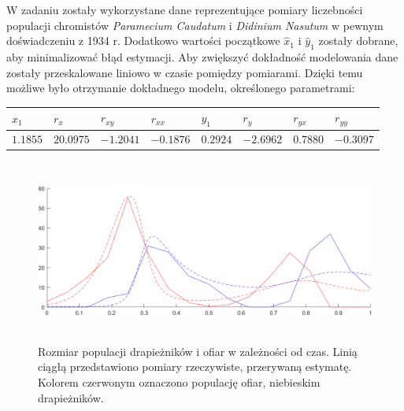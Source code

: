 \documentclass[12pt]{article}
\begin{document}
    W zadaniu zostały wykorzystane dane reprezentujące pomiary liczebności populacji chromistów \textit{Paramecium Caudatum} i \textit{Didinium Nasutum} w pewnym doświadczeniu z 1934 r. Dodatkowo wartości początkowe $\hat{x}_1$ i $\hat{y}_1$ zostały dobrane, aby minimalizować błąd estymacji. Aby zwiększyć dokładność modelowania dane zostały przeskalowane liniowo w czasie pomiędzy pomiarami. Dzięki temu możliwe było otrzymanie dokładnego modelu, określonego parametrami:
    \begin{table}[h!]
    \centering
        \begin{tabular}{|l|l|l|l|l|l|l|l|}
        \hline
        $x_1$ & $r_x$   & $r_{xy}$& $r_{xx}$ & $y_1$ & $r_y$  & $r_{yx}$  & $r_{yy}$ \\ \hline
        $1.1855$ & $20.0975$ &  $-1.2041$ &  $-0.1876$ &   $0.2924$  &  $-2.6962$  & $0.7880$ & $-0.3097$ \\ \hline
        \end{tabular}
    \end{table}
     \begin{figure}[h!]
        \centering
        \includegraphics[height=6cm]{zad3.png}
        \caption{Rozmiar populacji drapieżników i ofiar w zależności od czas. Linią ciągłą przedstawiono pomiary rzeczywiste, przerywaną estymatę. Kolorem czerwonym oznaczono populację ofiar, niebieskim drapieżników.}
    \end{figure}   

\break
\end{document}
